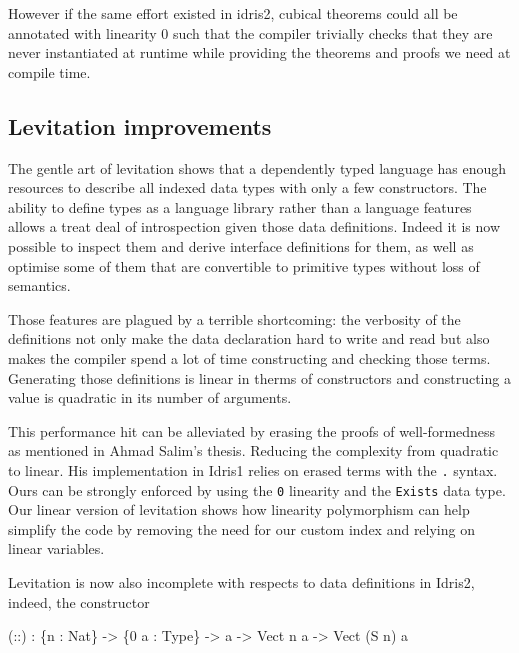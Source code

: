 \documentclass[
]{article}
\newenvironment{Shaded}{}{}
\newcommand{\DataTypeTok}[1]{\textcolor[rgb]{0.56,0.13,0.00}{#1}}
\newcommand{\DecValTok}[1]{\textcolor[rgb]{0.25,0.63,0.44}{#1}}
\newcommand{\NormalTok}[1]{#1}
\newcommand{\OperatorTok}[1]{\textcolor[rgb]{0.40,0.40,0.40}{#1}}
\newcommand{\OtherTok}[1]{\textcolor[rgb]{0.00,0.44,0.13}{#1}}
\begin{document}
However if the same effort existed in idris2, cubical theorems could all
be annotated with linearity 0 such that the compiler trivially checks
that they are never instantiated at runtime while providing the theorems
and proofs we need at compile time.

\hypertarget{levitation-improvements}{%
\subsection{Levitation improvements}\label{levitation-improvements}}

The gentle art of levitation shows that a dependently typed language has
enough resources to describe all indexed data types with only a few
constructors. The ability to define types as a language library rather
than a language features allows a treat deal of introspection given
those data definitions. Indeed it is now possible to inspect them and
derive interface definitions for them, as well as optimise some of them
that are convertible to primitive types without loss of semantics.

Those features are plagued by a terrible shortcoming: the verbosity of
the definitions not only make the data declaration hard to write and
read but also makes the compiler spend a lot of time constructing and
checking those terms. Generating those definitions is linear in therms
of constructors and constructing a value is quadratic in its number of
arguments.

This performance hit can be alleviated by erasing the proofs of
well-formedness as mentioned in Ahmad Salim's thesis. Reducing the
complexity from quadratic to linear. His implementation in Idris1 relies
on erased terms with the \texttt{.} syntax. Ours can be strongly
enforced by using the \texttt{0} linearity and the \texttt{Exists} data
type. Our linear version of levitation shows how linearity polymorphism
can help simplify the code by removing the need for our custom index and
relying on linear variables.

Levitation is now also incomplete with respects to data definitions in
Idris2, indeed, the constructor

\begin{Shaded}
\begin{Highlighting}[]
\NormalTok{(}\OtherTok{::}\NormalTok{) }\OperatorTok{:}\NormalTok{ \{n }\OperatorTok{:} \DataTypeTok{Nat}\NormalTok{\} }\OtherTok{{-}\textgreater{}}\NormalTok{ \{}\DecValTok{0}\NormalTok{ a }\OperatorTok{:} \DataTypeTok{Type}\NormalTok{\} }\OtherTok{{-}\textgreater{}}\NormalTok{ a }\OtherTok{{-}\textgreater{}} \DataTypeTok{Vect}\NormalTok{ n a }\OtherTok{{-}\textgreater{}} \DataTypeTok{Vect}\NormalTok{ (}\DataTypeTok{S}\NormalTok{ n) a }
\end{Highlighting}
\end{Shaded}
\end{document}
